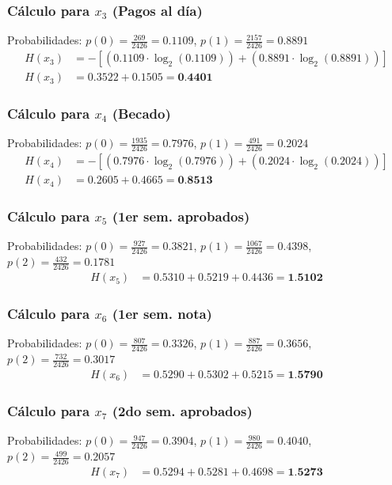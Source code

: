 \documentclass[12pt,a4paper]{article}
\begin{document}
\subsubsection{Cálculo para $x_3$ (Pagos al día)}
Probabilidades: $p(0) = \frac{269}{2426} = 0.1109$, $p(1) = \frac{2157}{2426} = 0.8891$
\begin{align*}
    H(x_3) &= -\left[ (0.1109 \cdot \log_2(0.1109)) + (0.8891 \cdot \log_2(0.8891)) \right] \\
    H(x_3) &= 0.3522 + 0.1505 = \textbf{0.4401}
\end{align*}

\subsubsection{Cálculo para $x_4$ (Becado)}
Probabilidades: $p(0) = \frac{1935}{2426} = 0.7976$, $p(1) = \frac{491}{2426} = 0.2024$
\begin{align*}
    H(x_4) &= -\left[ (0.7976 \cdot \log_2(0.7976)) + (0.2024 \cdot \log_2(0.2024)) \right] \\
    H(x_4) &= 0.2605 + 0.4665 = \textbf{0.8513}
\end{align*}

\subsubsection{Cálculo para $x_5$ (1er sem. aprobados)}
Probabilidades: $p(0) = \frac{927}{2426} = 0.3821$, $p(1) = \frac{1067}{2426} = 0.4398$, $p(2) = \frac{432}{2426} = 0.1781$
\begin{align*}
    H(x_5) &= 0.5310 + 0.5219 + 0.4436 = \textbf{1.5102}
\end{align*}

\subsubsection{Cálculo para $x_6$ (1er sem. nota)}
Probabilidades: $p(0) = \frac{807}{2426} = 0.3326$, $p(1) = \frac{887}{2426} = 0.3656$, $p(2) = \frac{732}{2426} = 0.3017$
\begin{align*}
    H(x_6) &= 0.5290 + 0.5302 + 0.5215 = \textbf{1.5790}
\end{align*}

\subsubsection{Cálculo para $x_7$ (2do sem. aprobados)}
Probabilidades: $p(0) = \frac{947}{2426} = 0.3904$, $p(1) = \frac{980}{2426} = 0.4040$, $p(2) = \frac{499}{2426} = 0.2057$
\begin{align*}
    H(x_7) &= 0.5294 + 0.5281 + 0.4698 = \textbf{1.5273}
\end{align*}
\end{document}
